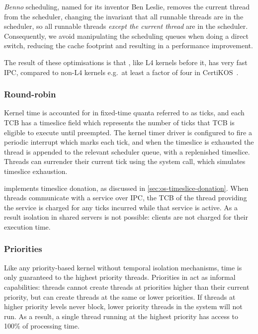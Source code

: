 \emph{Benno} scheduling, named for its inventor Ben Leslie, removes the current thread from the 
scheduler, changing the invariant that all runnable threads are in the scheduler, so all runnable
threads \emph{except the current thread} are in the scheduler. Consequently, we avoid manipulating the
scheduling queues when doing a direct switch, reducing the cache footprint and resulting in a performance improvement.

The result of these optimisations is that \selfour, like L4 kernels before it, has very fast
\gls{IPC}, compared to non-L4 kernels e.g.\ at least a factor of four in CertiKOS~\citep{Gu_SCWKSC_16}.

\subsubsection{Round-robin}
\label{sec:seL4-round-robin}

Kernel time is accounted for in fixed-time quanta referred to as ticks, and each TCB has a timeslice
field which represents the number of ticks that TCB is eligible to execute until preempted.
The kernel timer driver is configured to fire a periodic interrupt which marks each tick,
and when the timeslice is exhausted the thread is appended to the relevant scheduler queue,
with a replenished timeslice.
Threads can surrender their current tick using the \yield system call, which simulates
timeslice exhaustion. 

\selfour implements timeslice donation, as discussed in \cref{sec:os-timeslice-donation}. 
When threads communicate with a service over \gls{IPC}, the TCB of the thread providing the service
is charged for any ticks incurred while that service is active. As a result isolation in shared
servers is not possible: clients are not charged for their execution time.

\subsubsection{Priorities}

Like any priority-based kernel without temporal isolation mechanisms, time is only guaranteed to the highest priority threads.
Priorities in \selfour act as informal capabilities: threads cannot create threads at priorities higher than their current priority, but can create threads at the same or lower priorities.
If threads at higher priority levels never block, lower priority threads in the system will not run.
As a result, a single thread running at the highest priority has access to 100\% of processing time.

